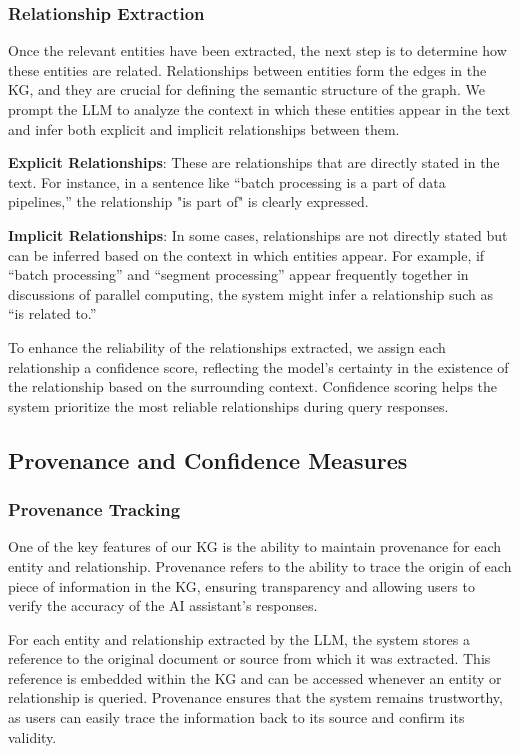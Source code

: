 \subsubsection{Relationship Extraction}

Once the relevant entities have been extracted, the next step is to determine how these entities are related. Relationships between entities form the edges in the KG, and they are crucial for defining the semantic structure of the graph. We prompt the LLM to analyze the context in which these entities appear in the text and infer both explicit and implicit relationships between them.

\textbf{Explicit Relationships}: These are relationships that are directly stated in the text. For instance, in a sentence like “batch processing is a part of data pipelines,” the relationship "is part of" is clearly expressed.

\textbf{Implicit Relationships}: In some cases, relationships are not directly stated but can be inferred based on the context in which entities appear. For example, if “batch processing” and “segment processing” appear frequently together in discussions of parallel computing, the system might infer a relationship such as “is related to.”

To enhance the reliability of the relationships extracted, we assign each relationship a confidence score, reflecting the model’s certainty in the existence of the relationship based on the surrounding context. Confidence scoring helps the system prioritize the most reliable relationships during query responses.

\subsection{Provenance and Confidence Measures}

\subsubsection{Provenance Tracking}

One of the key features of our KG is the ability to maintain provenance for each entity and relationship. Provenance refers to the ability to trace the origin of each piece of information in the KG, ensuring transparency and allowing users to verify the accuracy of the AI assistant’s responses.

For each entity and relationship extracted by the LLM, the system stores a reference to the original document or source from which it was extracted. This reference is embedded within the KG and can be accessed whenever an entity or relationship is queried. Provenance ensures that the system remains trustworthy, as users can easily trace the information back to its source and confirm its validity.

